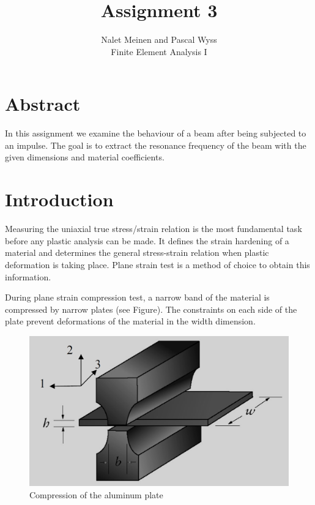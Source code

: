 \documentclass[12pt]{article}
\begin{document}


\title{Assignment 3}%
\author{Nalet Meinen and Pascal Wyss\\ %
Finite Element Analysis I
}
\maketitle
\section*{Abstract}
In this assignment we examine the behaviour of a beam after being subjected to an impulse.
The goal is to extract the resonance frequency of the beam with the given dimensions and material coefficients.



\tableofcontents
\pagebreak
\section{Introduction}
Measuring the uniaxial true stress/strain relation is the most fundamental task before any plastic
analysis can be made. It defines the strain hardening of a material and determines the general
stress-strain relation when plastic deformation is taking place. Plane strain test is a method of
choice to obtain this information.

During plane strain compression test, a narrow band of the material is compressed by narrow
plates (see Figure). The constraints on each side of the plate prevent deformations of the
material in the width dimension.

\begin{figure}[!htb]\label{fig:1}
  \centering
  \includegraphics[width=0.6\linewidth]{pics/shematics}
  \caption{Compression of the aluminum plate}
\end{figure}
\newpage
\end{document}
